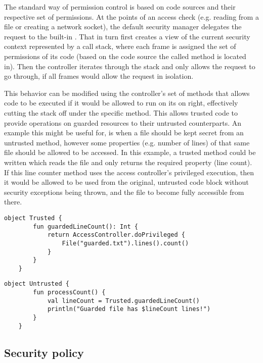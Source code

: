 	The standard way of permission control is based on code sources and their respective set of permissions. At the points of an access check (e.g. reading from a file or creating a network socket), the default security manager delegates the request to the built-in . That in turn first creates a view of the current security context represented by a call stack, where each frame is assigned the set of permissions of its code (based on the code source the called method is located in). Then the controller iterates through the stack and only allows the request to go through, if all frames would allow the request in isolation.
	
	This behavior can be modified using the controller's set of  methods that allows code to be executed if it would be allowed to run on its on right, effectively cutting the stack off under the specific method. This allows trusted code to provide operations on guarded resources to their untrusted counterparts. An example this might be useful for, is when a file should be kept secret from an untrusted method, however some properties (e.g. number of lines) of that same file should be allowed to be accessed. In this example, a trusted method could be written which reads the file and only returns the required property (line count). If this line counter method uses the access controller's privileged execution, then it would be allowed to be used from the original, untrusted code block without security exceptions being thrown, and the file to become fully accessible from there.

	\begin{center}
		\begin{minipage}{11cm}
		\begin{lstlisting}[title={\code{Trusted.kt}}]
	object Trusted {
		fun guardedLineCount(): Int {
			return AccessController.doPrivileged {
				File("guarded.txt").lines().count()
			}
		}
	}
		\end{lstlisting}
	
		\begin{lstlisting}[title={\code{Untrusted.kt}}]
	object Untrusted {
		fun processCount() {
			val lineCount = Trusted.guardedLineCount()
			println("Guarded file has $lineCount lines!")
		}
	}
		\end{lstlisting}
		\end{minipage}
	\end{center}

	\subsection{Security policy}
	
